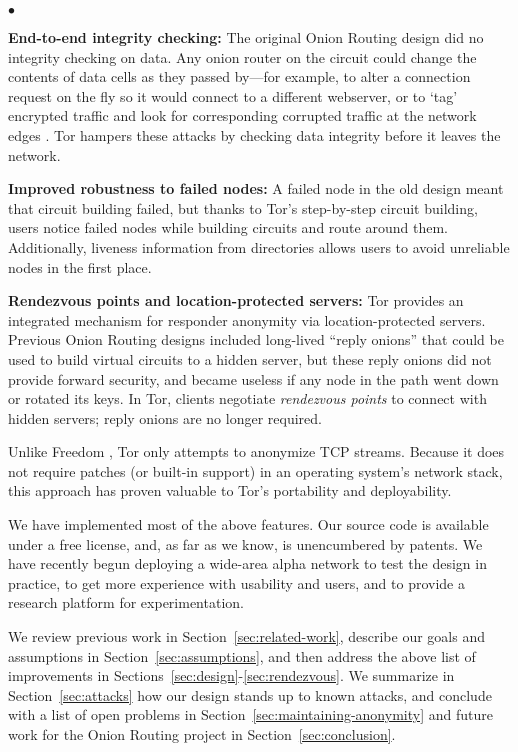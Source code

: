\documentclass[times,10pt,twocolumn]{article}
\newenvironment{tightlist}{\begin{list}{$\bullet$}{
  \setlength{\itemsep}{0mm}
    \setlength{\parsep}{0mm}
    }}{\end{list}}
\begin{document}
\begin{tightlist}
\item \textbf{End-to-end integrity checking:} The original Onion Routing
design did no integrity checking on data. Any onion router on the
circuit could change the contents of data cells as they passed by---for
example, to alter a connection request on the fly so it would connect
to a different webserver, or to `tag' encrypted traffic and look for
corresponding corrupted traffic at the network edges \cite{minion-design}.
Tor hampers these attacks by checking data integrity before it leaves
the network.

\item \textbf{Improved robustness to failed nodes:} A failed node
in the old design meant that circuit building failed, but thanks to
Tor's step-by-step circuit building, users notice failed nodes
while building circuits and route around them. Additionally, liveness
information from directories allows users to avoid unreliable nodes in
the first place.

\item \textbf{Rendezvous points and location-protected servers:}
Tor provides an integrated mechanism for responder anonymity via
location-protected servers.  Previous Onion Routing designs included
long-lived ``reply onions'' that could be used to build virtual circuits
to a hidden server, but these reply onions did not provide forward
security, and became useless if any node in the path went down
or rotated its keys.  In Tor, clients negotiate {\it rendezvous points}
to connect with hidden servers; reply onions are no longer required.
\end{tightlist}

Unlike Freedom \cite{freedom2-arch}, Tor only
attempts to anonymize TCP streams. Because it does not require patches
(or built-in support) in an operating system's network stack, this
approach has proven valuable to Tor's portability and deployability.

We have implemented most of the above features. Our source code is
available under a free license, and, as far as we know, is unencumbered by
patents. We have recently begun deploying a wide-area alpha network
to test the design in practice, to get more experience with usability
and users, and to provide a research platform for experimentation.

We review previous work in Section~\ref{sec:related-work}, describe
our goals and assumptions in Section~\ref{sec:assumptions},
and then address the above list of improvements in
Sections~\ref{sec:design}-\ref{sec:rendezvous}. We summarize
in Section~\ref{sec:attacks} how our design stands up to
known attacks, and conclude with a list of open problems in
Section~\ref{sec:maintaining-anonymity} and future work for the Onion
Routing project in Section~\ref{sec:conclusion}.
\end{document}
